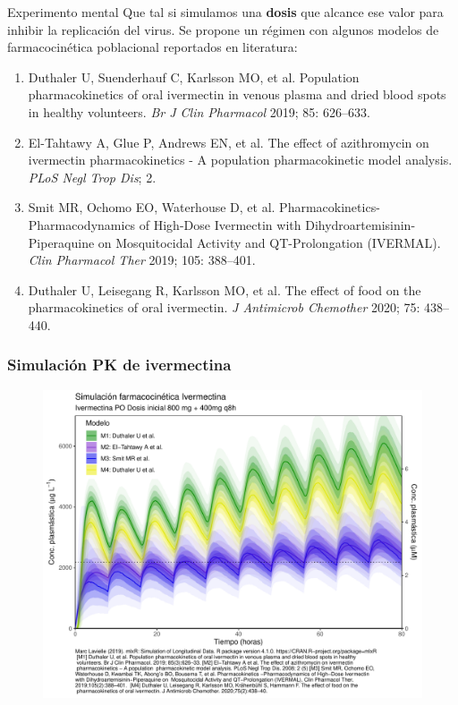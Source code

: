 \documentclass[12pt,xcolor=dvipsnames]{beamer}
\begin{document}
	\begin{frame}{Experimento mental}
		\scriptsize
		Que tal si simulamos una \textbf{dosis} que alcance ese valor para inhibir la replicación del virus. Se propone un régimen con algunos modelos de farmacocinética poblacional reportados en literatura: 
		\begin{enumerate}
			\setlength\itemsep{1.5em}
			\item Duthaler U, Suenderhauf C, Karlsson MO, et al. Population pharmacokinetics of oral ivermectin in venous plasma and dried blood spots in healthy volunteers. \textit{Br J Clin Pharmacol} 2019; 85: 626–633. \cite{Duthaler2019}
			\item El-Tahtawy A, Glue P, Andrews EN, et al. The effect of azithromycin on ivermectin pharmacokinetics - A population pharmacokinetic model analysis. \textit{PLoS Negl Trop Dis}; 2. \cite{El-Tahtawy2008}
			\item Smit MR, Ochomo EO, Waterhouse D, et al. Pharmacokinetics-Pharmacodynamics of High-Dose Ivermectin with Dihydroartemisinin-Piperaquine on Mosquitocidal Activity and QT-Prolongation (IVERMAL). \textit{Clin Pharmacol Ther} 2019; 105: 388–401. \cite{Smit2019}
			\item Duthaler U, Leisegang R, Karlsson MO, et al. The effect of food on the pharmacokinetics of oral ivermectin. \textit{J Antimicrob Chemother} 2020; 75: 438–440. \cite{Duthaler2020}
		\end{enumerate}
	\end{frame}

	\begin{frame}
		\frametitle[Experimento mental]{Simulación PK de ivermectina}
		\begin{figure}[t]
			\centering
			\label{fig:pk2opcional8}
			\includegraphics[width=0.8\linewidth]{../modelo_pkpd/PK2_opcional8}
		\end{figure}
	\end{frame}
\end{document}
